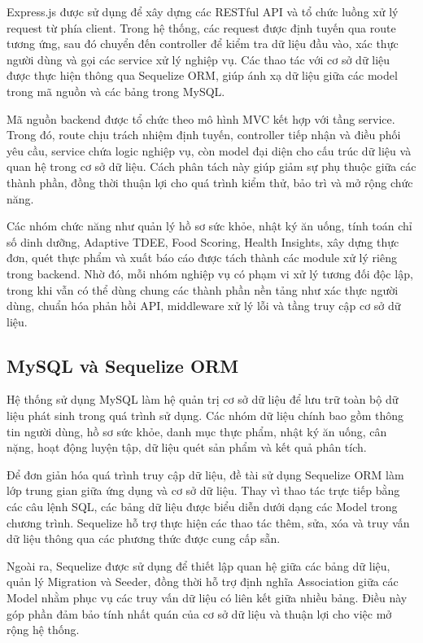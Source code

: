 \documentclass[12pt, a4paper]{report}
\begin{document}
Express.js được sử dụng để xây dựng các RESTful API và tổ chức luồng xử lý request từ phía client. Trong hệ thống, các request được định tuyến qua route tương ứng, sau đó chuyển đến controller để kiểm tra dữ liệu đầu vào, xác thực người dùng và gọi các service xử lý nghiệp vụ. Các thao tác với cơ sở dữ liệu được thực hiện thông qua Sequelize ORM, giúp ánh xạ dữ liệu giữa các model trong mã nguồn và các bảng trong MySQL.

Mã nguồn backend được tổ chức theo mô hình MVC kết hợp với tầng service. Trong đó, route chịu trách nhiệm định tuyến, controller tiếp nhận và điều phối yêu cầu, service chứa logic nghiệp vụ, còn model đại diện cho cấu trúc dữ liệu và quan hệ trong cơ sở dữ liệu. Cách phân tách này giúp giảm sự phụ thuộc giữa các thành phần, đồng thời thuận lợi cho quá trình kiểm thử, bảo trì và mở rộng chức năng.

Các nhóm chức năng như quản lý hồ sơ sức khỏe, nhật ký ăn uống, tính toán chỉ số dinh dưỡng, Adaptive TDEE, Food Scoring, Health Insights, xây dựng thực đơn, quét thực phẩm và xuất báo cáo được tách thành các module xử lý riêng trong backend. Nhờ đó, mỗi nhóm nghiệp vụ có phạm vi xử lý tương đối độc lập, trong khi vẫn có thể dùng chung các thành phần nền tảng như xác thực người dùng, chuẩn hóa phản hồi API, middleware xử lý lỗi và tầng truy cập cơ sở dữ liệu.

\subsection{MySQL và Sequelize ORM}Hệ thống sử dụng MySQL làm hệ quản trị cơ sở dữ liệu để lưu trữ toàn bộ dữ liệu phát sinh trong quá trình sử dụng. Các nhóm dữ liệu chính bao gồm thông tin người dùng, hồ sơ sức khỏe, danh mục thực phẩm, nhật ký ăn uống, cân nặng, hoạt động luyện tập, dữ liệu quét sản phẩm và kết quả phân tích.

Để đơn giản hóa quá trình truy cập dữ liệu, đề tài sử dụng Sequelize ORM làm lớp trung gian giữa ứng dụng và cơ sở dữ liệu. Thay vì thao tác trực tiếp bằng các câu lệnh SQL, các bảng dữ liệu được biểu diễn dưới dạng các Model trong chương trình. Sequelize hỗ trợ thực hiện các thao tác thêm, sửa, xóa và truy vấn dữ liệu thông qua các phương thức được cung cấp sẵn.

Ngoài ra, Sequelize được sử dụng để thiết lập quan hệ giữa các bảng dữ liệu, quản lý Migration và Seeder, đồng thời hỗ trợ định nghĩa Association giữa các Model nhằm phục vụ các truy vấn dữ liệu có liên kết giữa nhiều bảng. Điều này góp phần đảm bảo tính nhất quán của cơ sở dữ liệu và thuận lợi cho việc mở rộng hệ thống.
\end{document}
